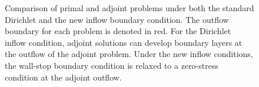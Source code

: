 \begin{figure}
\caption{Comparison of primal and adjoint problems under both the standard Dirichlet and the new inflow boundary condition. The outflow boundary for each problem is denoted in red. For the Dirichlet inflow condition, adjoint solutions can develop boundary layers at the outflow of the adjoint problem. Under the new inflow conditions, the wall-stop boundary condition is relaxed to a zero-stress condition at the adjoint outflow.}
\end{figure}

